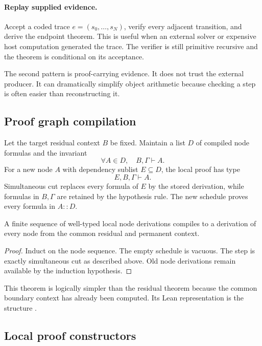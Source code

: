 \paragraph{Replay supplied evidence.}
Accept a coded trace \(e=(s_0,\ldots,s_N)\), verify every adjacent transition, and derive the endpoint theorem.  This is useful when an external solver or expensive host computation generated the trace.  The verifier is still primitive recursive and the theorem is conditional on its acceptance.

The second pattern is proof-carrying evidence.  It does not trust the external producer.  It can dramatically simplify object arithmetic because checking a step is often easier than reconstructing it.

\subsection{Proof graph compilation}

Let the target residual context \(B\) be fixed.  Maintain a list \(D\) of compiled node formulas and the invariant
\[
 \forall A\in D,\quad B,\Gamma\vdash A.
\]
For a new node \(A\) with dependency sublist \(E\subseteq D\), the local proof has type
\[
 E,B,\Gamma\vdash A.
\]
Simultaneous cut replaces every formula of \(E\) by the stored derivation, while formulas in \(B,\Gamma\) are retained by the hypothesis rule.  The new schedule proves every formula in \(A::D\).

\begin{theorem}\label{thm:proof-fold}
A finite sequence of well-typed local node derivations compiles to a derivation of every node from the common residual and permanent context.
\end{theorem}

\begin{proof}
Induct on the node sequence.  The empty schedule is vacuous.  The step is exactly simultaneous cut as described above.  Old node derivations remain available by the induction hypothesis.
\end{proof}

This theorem is logically simpler than the residual theorem because the common boundary context has already been computed.  Its Lean representation is the structure .

\subsection{Local proof constructors}

